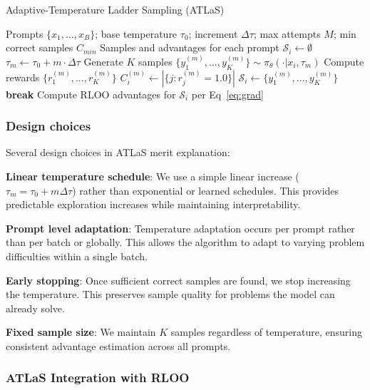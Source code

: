 \documentclass{article}
\begin{document}
\begin{algorithm}[H]
\caption{Adaptive-Temperature Ladder Sampling (ATLaS)}
\label{alg:atlas}
\begin{algorithmic}[1]
\Require Prompts $\{x_1, \ldots, x_B\}$; base temperature $\tau_0$; increment $\Delta\tau$; max attempts $M$; min correct samples $C_{min}$
\Ensure Samples and advantages for each prompt
    \State $\mathcal{S}_i \gets \emptyset$ 
        \State $\tau_m \gets \tau_0 + m \cdot \Delta\tau$
        \State Generate $K$ samples $\{y_1^{(m)}, ..., y_K^{(m)}\} \sim \pi_\theta(\cdot|x_i, \tau_m)$
        \State Compute rewards $\{r_1^{(m)}, ..., r_K^{(m)}\}$
        \State $C_i^{(m)} \gets |\{j : r_j^{(m)} = 1.0\}|$ 
            \State $\mathcal{S}_i \gets \{y_1^{(m)}, ..., y_K^{(m)}\}$
            \State \textbf{break}
        \EndIf
    \EndFor
    \State Compute RLOO advantages for $\mathcal{S}_i$ per Eq~\ref{eq:grad}
\EndFor
\end{algorithmic}
\end{algorithm}

\subsubsection{Design choices}

Several design choices in ATLaS merit explanation:

\textbf{Linear temperature schedule}: We use a simple linear increase ($\tau_m = \tau_0 + m\Delta\tau$) rather than exponential or learned schedules. This provides predictable exploration increases while maintaining interpretability.

\textbf{Prompt level adaptation}: Temperature adaptation occurs per prompt rather than per batch or globally. This allows the algorithm to adapt to varying problem difficulties within a single batch.

\textbf{Early stopping}: Once sufficient correct samples are found, we stop increasing the temperature. This preserves sample quality for problems the model can already solve.

\textbf{Fixed sample size}: We maintain $K$ samples regardless of temperature, ensuring consistent advantage estimation across all prompts.

\subsubsection{ATLaS Integration with RLOO}
\end{document}
